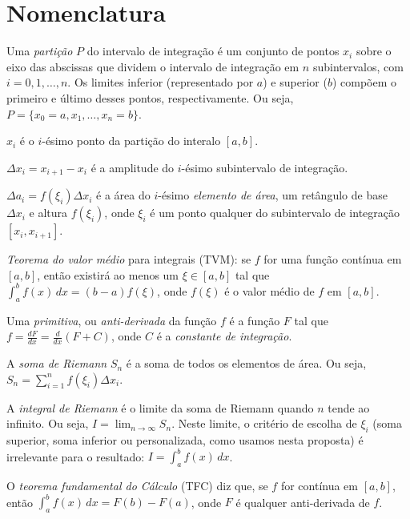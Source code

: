 \documentclass[a4paper,12pt]{scrartcl}
\begin{document}
  

    
  \section*{Nomenclatura}
    \begin{compactitem}
      \item Uma \emph{partição} $P$ do intervalo de integração é um conjunto de pontos $x_i$ sobre o eixo das abscissas que dividem o intervalo de integração em $n$ subintervalos, com $i = 0, 1, \ldots, n$. Os limites inferior (representado por $a$) e superior ($b$) compõem o primeiro e último desses pontos, respectivamente. Ou seja, $P = \{x_0 = a, x_1, \ldots, x_n = b\}$.
      
      \item $x_i$ é o $i$-ésimo ponto da partição do interalo $[a,b]$.
      
      \item $\Delta x_i = x_{i+1} - x_i$ é a amplitude do $i$-ésimo subintervalo de integração.
      
      \item $\Delta a_i = f(\xi_i) \Delta x_i$ é a área do $i$-ésimo \emph{elemento de área}, um retângulo de base $\Delta x_i$ e altura $f(\xi_i)$, onde $\xi_i$ é um ponto qualquer do subintervalo de integração $[x_i, x_{i + 1}]$.

      \item \emph{Teorema do valor médio} para integrais (TVM): se $f$ for uma função contínua em $[a,b]$, então existirá ao menos um $\xi \in [a,b]$ tal que $\int_a^b f(x)\,dx = (b-a) f(\xi)$, onde $f(\xi)$ é o valor médio de $f$ em $[a,b]$.

      \item Uma \emph{primitiva}, ou \emph{anti-derivada} da função $f$ é a função $F$ tal que $f = \frac{dF}{dx} = \frac{d}{dx}\left(F + C\right)$, onde $C$ é a \emph{constante de integração}.

      \item A \emph{soma de Riemann} $S_n$ é a soma de todos os elementos de área. Ou seja, $S_n = \sum_{i=1}^{n} f(\xi_i) \Delta x_i$.

      \item A \emph{integral de Riemann} é o limite da soma de Riemann quando $n$ tende ao infinito. Ou seja, $I = \lim_{n \to \infty} S_n$. Neste limite, o critério de escolha de $\xi_i$ (soma superior, soma inferior ou personalizada, como usamos nesta proposta) é irrelevante para o resultado: $I = \int_a^b f(x)\, dx$.

      \item O \emph{teorema fundamental do Cálculo} (TFC) diz que, se $f$ for contínua em $[a,b]$, então $\int_a^b f(x)\,dx = F(b) - F(a)$, onde $F$ é qualquer anti-derivada de $f$.
    \end{compactitem}
\end{document}
